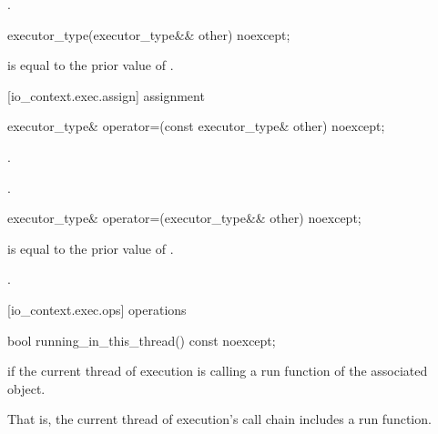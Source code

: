 \begin{itemdescr}
\pnum
\postconditions {}.
\end{itemdescr}

\begin{itemdecl}
executor_type(executor_type&& other) noexcept;
\end{itemdecl}

\begin{itemdescr}
\pnum
\postconditions {} is equal to the prior value of .
\end{itemdescr}



[io_context.exec.assign]{ assignment}

%
\begin{itemdecl}
executor_type& operator=(const executor_type& other) noexcept;
\end{itemdecl}

\begin{itemdescr}
\pnum
\postconditions {}.

\pnum
\returns {}.
\end{itemdescr}

\begin{itemdecl}
executor_type& operator=(executor_type&& other) noexcept;
\end{itemdecl}

\begin{itemdescr}
\pnum
\postconditions {} is equal to the prior value of .

\pnum
\returns {}.
\end{itemdescr}



[io_context.exec.ops]{ operations}

%
\begin{itemdecl}
bool running_in_this_thread() const noexcept;
\end{itemdecl}

\begin{itemdescr}
\pnum
\returns {} if the current thread of execution is calling a run function of the associated  object. \begin{note} That is, the current thread of execution's call chain includes a run function. \end{note}
\end{itemdescr}

